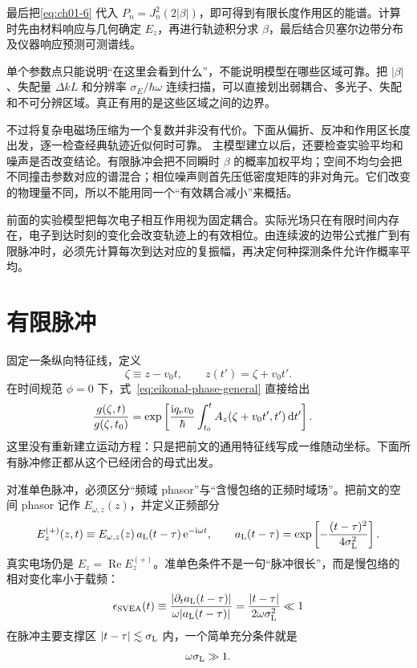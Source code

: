 最后把\cref{eq:ch01-6} 代入 $P_n=J_n^2(2|\beta|)$，即可得到有限长度作用区的能谱。计算时先由材料响应与几何确定 $E_z$，再进行轨迹积分求 $\beta$，最后结合贝塞尔边带分布及仪器响应预测可测谱线。


单个参数点只能说明“在这里会看到什么”，不能说明模型在哪些区域可靠。把 $|\beta|$、失配量 $\Delta kL$ 和分辨率 $\sigma_E/\hbar\omega$ 连续扫描，可以直接划出弱耦合、多光子、失配和不可分辨区域。真正有用的是这些区域之间的边界。


不过将复杂电磁场压缩为一个复数并非没有代价。下面从偏折、反冲和作用区长度出发，逐一检查经典轨迹近似何时可靠。
主模型建立以后，还要检查实验平均和噪声是否改变结论。有限脉冲会把不同瞬时 $\beta$ 的概率加权平均；空间不均匀会把不同撞击参数对应的谱混合；相位噪声则首先压低密度矩阵的非对角元。它们改变的物理量不同，所以不能用同一个“有效耦合减小”来概括。


\par\medskip
前面的实验模型把每次电子相互作用视为固定耦合。实际光场只在有限时间内存在，电子到达时刻的变化会改变轨迹上的有效相位。由连续波的边带公式推广到有限脉冲时，必须先计算每次到达对应的复振幅，再决定何种探测条件允许作概率平均。
\par\medskip


\section{有限脉冲}
固定一条纵向特征线，定义
\begin{equation}
\zeta\equiv z-v_0t,\qquad z(t')=\zeta+v_0t'.
\label{eq:moving-coordinate}
\end{equation}
在时间规范 $\phi=0$ 下，式~\cref{eq:eikonal-phase-general} 直接给出
\begin{align}
\frac{g(\zeta,t)}{g(\zeta,t_0)}
&=\exp\left[
\frac{\mathrm{i} q_{\rm e}v_0}{\hbar}
\int_{t_0}^{t} A_z(\zeta+v_0t',t')\,\mathrm{d} t'
\right].
\label{eq:g-integral}
\end{align}
这里没有重新建立运动方程：只是把前文的通用特征线写成一维随动坐标。下面所有脉冲修正都从这个已经闭合的母式出发。


对准单色脉冲，必须区分“频域 phasor”与“含慢包络的正频时域场”。把前文的空间 phasor 记作 $E_{\omega,z}(z)$，并定义正频部分
\begin{equation}
 E_z^{(+)}(z,t)
 \equiv E_{\omega,z}(z)\,
 a_{\rm L}(t-\tau)\,
 \mathrm{e}^{-\mathrm{i}\omega t},
 \qquad
 a_{\rm L}(t-\tau)
 =\exp\left[-\frac{(t-\tau)^2}{4\sigma_{\mathrm L}^2}\right].
 \label{eq:complex-field}
\end{equation}
真实电场仍是 $E_z=\operatorname{Re}E_z^{(+)}$。准单色条件不是一句“脉冲很长”，而是慢包络的相对变化率小于载频：
\begin{equation}
 {
 \epsilon_{\rm SVEA}(t)
 \equiv
 \frac{|\partial_t a_{\rm L}(t-\tau)|}
 {\omega |a_{\rm L}(t-\tau)|}
 =
 \frac{|t-\tau|}{2\omega\sigma_{\rm L}^2}
 \ll1}
 \label{eq:SVEA-field-condition}
\end{equation}
在脉冲主要支撑区 $|t-\tau|\lesssim\sigma_{\rm L}$ 内，一个简单充分条件就是
\begin{equation}
 {\omega\sigma_{\rm L}\gg1.}
 \label{eq:quasimonochromatic-condition}
\end{equation}

